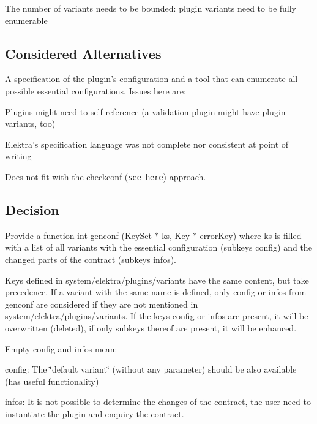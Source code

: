 \begin{DoxyItemize}
\item The number of variants needs to be bounded\+: plugin variants need to be fully enumerable
\end{DoxyItemize}

\subsection*{Considered Alternatives}

A specification of the plugin's configuration and a tool that can enumerate all possible essential configurations. Issues here are\+:


\begin{DoxyItemize}
\item Plugins might need to self-\/reference (a validation plugin might have plugin variants, too)
\item Elektra's specification language was not complete nor consistent at point of writing
\item Does not fit with the {\ttfamily checkconf} (\href{http://git.libelektra.org/issues/559}{\tt see here}) approach.
\end{DoxyItemize}

\subsection*{Decision}


\begin{DoxyEnumerate}
\item Provide a function {\ttfamily int genconf (Key\+Set $\ast$ ks, Key $\ast$ error\+Key)} where {\ttfamily ks} is filled with a list of all variants with the essential configuration (subkeys {\ttfamily config}) and the changed parts of the contract (subkeys {\ttfamily infos}).
\item Keys defined in {\ttfamily system/elektra/plugins/variants} have the same content, but take precedence. If a variant with the same name is defined, only {\ttfamily config} or {\ttfamily infos} from {\ttfamily genconf} are considered if they are not mentioned in {\ttfamily system/elektra/plugins/variants}. If the keys {\ttfamily config} or {\ttfamily infos} are present, it will be overwritten (deleted), if only subkeys thereof are present, it will be enhanced.
\item Empty {\ttfamily config} and {\ttfamily infos} mean\+:
\begin{DoxyItemize}
\item {\ttfamily config}\+: The \char`\"{}default variant\char`\"{} (without any parameter) should be also available (has useful functionality)
\item {\ttfamily infos}\+: It is not possible to determine the changes of the contract, the user need to instantiate the plugin and enquiry the contract.
\end{DoxyItemize}
\end{DoxyEnumerate}

